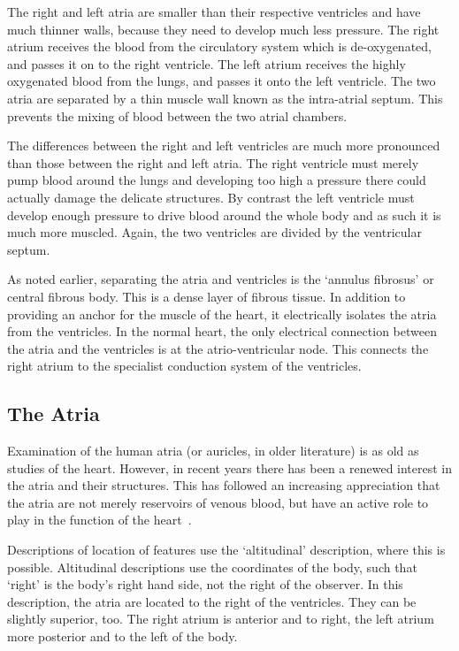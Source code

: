 The right and left atria are smaller than their respective ventricles and have
much thinner walls, because they need to develop much less pressure.  The right
atrium receives the blood from the circulatory system which is de-oxygenated,
and passes it on to the right ventricle.  The left atrium receives the highly
oxygenated blood from the lungs, and passes it onto the left ventricle.  The two
atria are separated by a thin muscle wall known as the intra-atrial septum.
This prevents the mixing of blood between the two atrial chambers.

The differences between the right and left ventricles are much more pronounced
than those between the right and left atria.  The right ventricle must merely
pump blood around the lungs and developing too high a pressure there could
actually damage the delicate structures.  By contrast the left ventricle must
develop enough pressure to drive blood around the whole body and as such it is
much more muscled.  Again, the two ventricles are divided by the ventricular
septum.

As noted earlier, separating the atria and ventricles is the `annulus fibrosus'
or central fibrous body.
This is a dense layer of fibrous tissue.
In addition to providing an anchor for the muscle of the heart, it electrically
isolates the atria from the ventricles.
In the normal heart, the only electrical connection between the atria and the
ventricles is at the atrio-ventricular node.
This connects the right atrium to the specialist conduction system of the
ventricles.

\subsection{The Atria}

Examination of the human atria (or auricles, in older literature) is as old as studies
of the heart.
However, in recent years there has been a renewed interest in the
atria and their structures.
This has followed an increasing appreciation that the atria are not merely
reservoirs of venous blood, but have an active role to play in the function of
the heart~\cite{Ho2002a,Ho2002b,Ho2009,Platonov2007,Platonov2008}.

Descriptions of location of features use the `altitudinal' description, where
this is possible.
Altitudinal descriptions use the coordinates of the body, such that `right' is
the body's right hand side, not the right of the observer.
In this description, the atria are located to the right of the ventricles.
They can be slightly superior, too.
The right atrium is anterior and to right, the left atrium more posterior and to
the left of the body.


